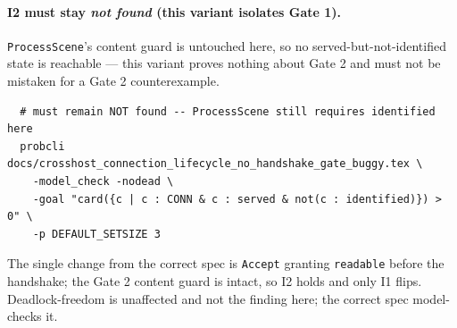 \documentclass[a4paper,10pt,fleqn]{article}
\begin{document}
\paragraph{I2 must stay \emph{not found} (this variant isolates Gate 1).}
\texttt{ProcessScene}'s content guard is untouched here, so no
served-but-not-identified state is reachable --- this variant proves
nothing about Gate 2 and must not be mistaken for a Gate 2
counterexample.
\begin{verbatim}
  # must remain NOT found -- ProcessScene still requires identified here
  probcli docs/crosshost_connection_lifecycle_no_handshake_gate_buggy.tex \
    -model_check -nodead \
    -goal "card({c | c : CONN & c : served & not(c : identified)}) > 0" \
    -p DEFAULT_SETSIZE 3
\end{verbatim}

The single change from the correct spec is \texttt{Accept} granting
\texttt{readable} before the handshake; the Gate 2 content guard is intact,
so I2 holds and only I1 flips.  Deadlock-freedom is unaffected and not the
finding here; the correct spec model-checks it.
\end{document}
